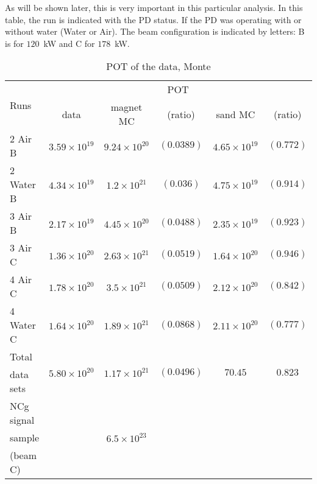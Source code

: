 As will be shown later, this is very important in this particular
analysis.  In this table, the run is indicated with the \Gls{PD}
status. If the \Gls{PD} was operating with or without water (Water or
Air). The beam configuration is indicated by letters: B is for
$120$~kW and C for $178$~kW.

\begin{table}[ht]
  \begin{adjustbox}{center}
    \begin{tabular}{lccccc}
      \toprule
      \multirow{2}{*}{Runs} & \multicolumn{5}{c}{POT}\\
                            & data & \gls{magnet} \Gls{MC} & (ratio) & \gls{sand} \Gls{MC} & (ratio) \\
      \midrule
      2 Air   B & $3.59\times 10^{19}$ & $9.24\times 10^{20}$ & $(0.0389)$ & $4.65\times 10^{19}$ & $(0.772)$ \\
      2 Water B & $4.34\times 10^{19}$ & $1.2 \times 10^{21}$ & $(0.036) $ & $4.75\times 10^{19}$ & $(0.914)$ \\
      3 Air   B & $2.17\times 10^{19}$ & $4.45\times 10^{20}$ & $(0.0488)$ & $2.35\times 10^{19}$ & $(0.923)$ \\
      3 Air   C & $1.36\times 10^{20}$ & $2.63\times 10^{21}$ & $(0.0519)$ & $1.64\times 10^{20}$ & $(0.946)$ \\
      4 Air   C & $1.78\times 10^{20}$ & $3.5 \times 10^{21}$ & $(0.0509)$ & $2.12\times 10^{20}$ & $(0.842)$ \\
      4 Water C & $1.64\times 10^{20}$ & $1.89\times 10^{21}$ & $(0.0868)$ & $2.11\times 10^{20}$ & $(0.777)$ \\
      \midrule
      Total  & \multirow{2}{*}{$5.80\times 10^{20}$} & \multirow{2}{*}{$1.17\times 10^{21}$}& \multirow{2}{*}{$(0.0496)$}  & \multirow{2}{*}{$70.45$} & \multirow{2}{*}{$0.823$} \\
      data sets     &                        &        &           &       &       \\
      \midrule
      \Gls{NCg} signal  &  & \multirow{3}{*}{$6.5\times 10^{23}$} & \\
      sample     &  & & & & \\ 
      (beam C)   &  & & & & \\ 
      \bottomrule
    \end{tabular}
  \end{adjustbox}
  \caption[POT of the data and Monte Carlo (magnet, sand and signal)
  samples used for the NC$\gamma$ searches]{POT of the data, Monte
}
\end{table}
